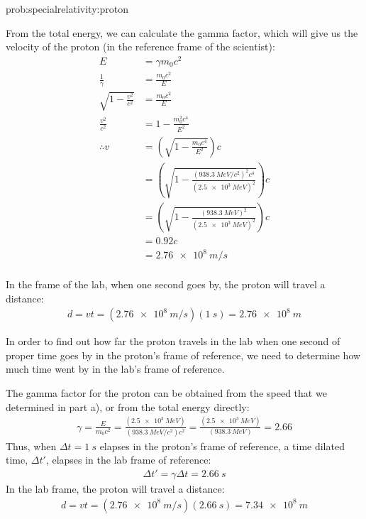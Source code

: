 \begin{solutionParts}{prob:specialrelativity:proton}
{\label{soln:specialrelativity:proton}
\item From the total energy, we can calculate the gamma factor, which will give us the velocity of the proton (in the reference frame of the scientist):
\begin{align*}
E &= \gamma m_0 c^2\\
\frac{1}{\gamma} &= \frac{m_0c^2}{E}\\
\sqrt{1-\frac{v^2}{c^2}} &= \frac{m_0c^2}{E}\\
\frac{v^2}{c^2} &= 1 - \frac{m_0^2c^4}{E^2}\\	
\therefore v &= \left(\sqrt{1-\frac{m_0c^4}{E^2}}\right) c\\
&= \left(\sqrt{1-\frac{(\SI{938.3}{MeV/c^2})^2c^4}{(\SI{2.5e3}{MeV})^2}}\right)c\\
&= \left(\sqrt{1-\frac{(\SI{938.3}{MeV})^2}{(\SI{2.5e3}{MeV})^2}}\right)c\\
&= 0.92c\\ 
&= \SI{2.76e8}{m/s}\\
\end{align*}
\item In the frame of the lab, when one second goes by, the proton will travel a distance:
\begin{align*}
d = vt = (\SI{2.76e8}{m/s})(\SI{1}{s})=\SI{2.76e8}{m}
\end{align*}
\item In order to find out how far the proton travels in the lab when one second of proper time goes by in the proton's frame of reference, we need to determine how much time went by in the lab's frame of reference. 

The gamma factor for the proton can be obtained from the speed that we determined in part a), or from the total energy directly:
\begin{align*}
\gamma = \frac{E}{m_0c^2}=\frac{(\SI{2.5e3}{MeV})}{(\SI{938.3}{MeV/c^2})c^2}=\frac{(\SI{2.5e3}{MeV})}{(\SI{938.3}{MeV})}=2.66
\end{align*}
Thus, when $\Delta t=\SI{1}{s}$ elapses in the proton's frame of reference, a time dilated time, $\Delta t'$, elapses in the lab frame of reference:
\begin{align*}
\Delta t' = \gamma \Delta t = \SI{2.66}{s}
\end{align*}
In the lab frame, the proton will travel a distance:
\begin{align*}
d = vt = (\SI{2.76e8}{m/s})(\SI{2.66}{s})=\SI{7.34e8}{m}
\end{align*}

}
\end{solutionParts}
